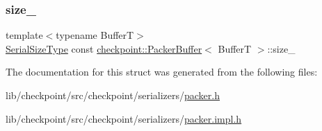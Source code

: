 \subsubsection{\texorpdfstring{size\+\_\+}{size\_}}
{\footnotesize\ttfamily template$<$typename BufferT$>$ \\
\hyperlink{namespacecheckpoint_a083f6674da3f94c2901b18c6d238217c}{Serial\+Size\+Type} const \hyperlink{structcheckpoint_1_1_packer_buffer}{checkpoint\+::\+Packer\+Buffer}$<$ BufferT $>$\+::size\+\_\+\hspace{0.3cm}{\ttfamily [private]}}



The documentation for this struct was generated from the following files\+:\begin{DoxyCompactItemize}
\item 
lib/checkpoint/src/checkpoint/serializers/\hyperlink{packer_8h}{packer.\+h}\item 
lib/checkpoint/src/checkpoint/serializers/\hyperlink{packer_8impl_8h}{packer.\+impl.\+h}\end{DoxyCompactItemize}
